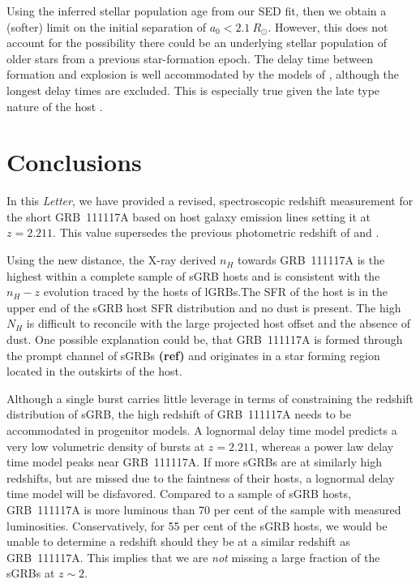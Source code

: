 \documentclass{aa}    %
\newcommand\todo[1]{\textbf{(#1)}}
\begin{document}
Using the inferred stellar population age from our SED fit, then we obtain a
(softer) limit on the initial separation of $a_0 < 2.1~R_\odot$. However, this
does not account for the possibility there could be an underlying stellar
population of older stars from a previous star-formation epoch. The delay time
between formation and explosion is well accommodated by the models of
\citet{Belczynski2006}, although the longest delay times are excluded.
This is especially true given the late type nature of the host
\citep{OShaughnessy2008}.

\section{Conclusions}

In this \emph{Letter}, we have provided a revised, spectroscopic redshift
measurement for the short GRB~111117A based on host galaxy emission lines
setting it at $z = 2.211$. This value supersedes the previous photometric
redshift of \citet{Margutti2012} and \citet{Sakamoto2013}. 

Using the new distance, the X-ray derived $n_H$ towards GRB~111117A is the
highest within a complete sample of sGRB hosts and is consistent with the
$n_H-z$ evolution traced by the hosts of lGRBs.The SFR of the host is in the
upper end of the sGRB host SFR distribution and no dust is present. The high
$N_H$ is difficult to reconcile with the large projected host offset and the
absence of dust. One possible explanation could be, that GRB~111117A is formed
through the prompt channel of sGRBs \todo{ref} and originates in a star forming
region located in the outskirts of the host.

Although a single burst carries little leverage in terms of constraining the
redshift distribution of sGRB, the high redshift of GRB~111117A needs to be
accommodated in progenitor models. A lognormal delay time model predicts a very low volumetric
density of bursts at $z = 2.211$, whereas a power law delay time model peaks
near GRB~111117A. If more sGRBs are at similarly high redshifts, but are missed due to
the faintness of their hosts, a lognormal delay time model will be disfavored.
Compared to a sample of sGRB hosts, GRB~111117A is more luminous than 70 per
cent of the sample with measured luminosities. Conservatively, for 55 per
cent of the sGRB hosts, we would be unable to determine a redshift should they be at 
a similar redshift as GRB~111117A. This implies that we are \textit{not} missing a large
fraction of the sGRBs at $z \sim 2$.
\end{document}
